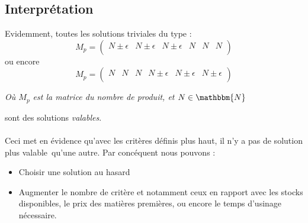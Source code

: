 \subsection{Interprétation}
Evidemment, toutes les solutions triviales du type :
\begin{displaymath}
M_p = \left(
\begin{array}{cccccc}
N \pm \epsilon & N \pm \epsilon & N \pm \epsilon & N & N & N\\
\end{array}
\right)
\end{displaymath}
ou encore 
\begin{displaymath}
M_p = \left(
\begin{array}{cccccc}
N & N & N & N \pm \epsilon & N \pm \epsilon & N \pm \epsilon\\
\end{array}
\right)
\end{displaymath}
\begin{center}
\textsl{Où $M_p$ est la matrice du nombre de produit, et $N \in \mathbbm{N}$}
\end{center}
sont des solutions \emph{valables}.\\
~\\
Ceci met en évidence qu'avec les critères définis plus haut, il n'y a pas de
solution plus \og valable\fg ~qu'une autre. Par concéquent nous pouvons :
\begin{itemize}
  \item Choisir une solution au hasard
  \item Augmenter le nombre de critère et notamment ceux en rapport avec les
  stocks disponibles, le prix des matières premières, ou encore le temps
  d'usinage nécessaire.
\end{itemize}
